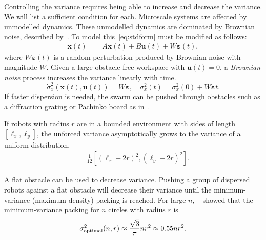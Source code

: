 Controlling the variance requires being able to increase and decrease the variance.  We will list a sufficient condition for each. 
Microscale systems are affected by unmodelled dynamics. 
These unmodelled dynamics are dominated by Brownian noise, described by~\cite{einstein1956investigations}. 
To model this~\eqref{eq:stdform} must be modified as follows:
\begin{align}
\dot{\mathbf{x}}(t)  &=  A \mathbf{x}(t) + B \mathbf{u}(t) + W \bm{\varepsilon}(t),
\end{align}
where $W\bm{\varepsilon}(t)$ is a random perturbation produced by Brownian noise with magnitude $W$. Given a large obstacle-free workspace with $\mathbf{u}(t)= 0$, a \emph{Brownian noise} process increases the variance linearly with time.
\begin{equation}
\dot{\sigma}_x^2(\mathbf{x}(t), \mathbf{u}(t))  = W \bm{\varepsilon},
\quad \sigma_x^2(t)  = \sigma_x^2(0) + W \bm{\varepsilon} t.
\end{equation}
 If faster dispersion is needed, the swarm can be pushed through obstacles such as a diffraction grating or Pachinko board as in~\cite{Becker2013b}. 

If robots with radius $r$ are in a bounded environment with sides of length $[\ell_x, \ell_y]$, the unforced variance asymptotically grows to the variance of a uniform distribution,
\begin{align}
[\sigma_x^2,\sigma_y^2] = \frac{1}{12}[ (\ell_x - 2 r)^2,(\ell_y - 2 r)^2].\label{eq:VarianceUniformDistribution}
\end{align}

 A flat obstacle can be used to decrease variance. Pushing a group of dispersed robots against a flat obstacle will decrease their variance until the minimum-variance (maximum density) packing  is reached. For large $n$, ~\cite{graham1990penny} showed that the minimum-variance packing  for $n$ circles with radius $r$ is 
 \begin{align} \label{eq:optimalvar}
 \sigma^2_{\rm{optimal}}(n,r) \approx   \frac{\sqrt{3}}{\pi} n r^2\approx 0.55 n r^2.
 \end{align} 

